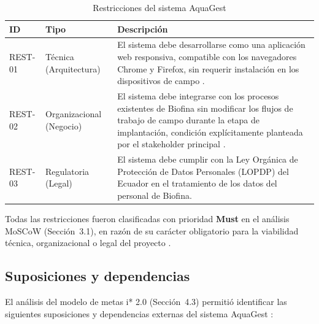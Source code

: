 \documentclass[12pt,a4paper]{article}
\begin{document}
\begin{longtable}{|p{1.6cm}|p{2.8cm}|p{9.8cm}|}
\caption{Restricciones del sistema AquaGest} \\
\hline
\textbf{ID} & \textbf{Tipo} & \textbf{Descripción} \\
\hline
\endfirsthead
\endhead
REST-01 & Técnica (Arquitectura) &
El sistema debe desarrollarse como una aplicación web responsiva, compatible
con los navegadores Chrome y Firefox, sin requerir instalación en los
dispositivos de campo \cite{ISO29148:2018}. \\
\hline
REST-02 & Organizacional (Negocio) &
El sistema debe integrarse con los procesos existentes de Biofina sin
modificar los flujos de trabajo de campo durante la etapa de implantación,
condición explícitamente planteada por el stakeholder principal
\cite{Robertson2012}. \\
\hline
REST-03 & Regulatoria (Legal) &
El sistema debe cumplir con la Ley Orgánica de Protección de Datos Personales
(LOPDP) del Ecuador en el tratamiento de los datos del personal de Biofina. \\
\hline
\end{longtable}

Todas las restricciones fueron clasificadas con prioridad \textbf{Must} en el
análisis MoSCoW (Sección~3.1), en razón de su carácter obligatorio para la
viabilidad técnica, organizacional o legal del proyecto \cite{Kravchenko2022}.

\subsection{Suposiciones y dependencias}

El análisis del modelo de metas i* 2.0 (Sección~4.3) permitió identificar las
siguientes suposiciones y dependencias externas del sistema AquaGest
\cite{Yu1995,Kavakli2002}:
\end{document}
